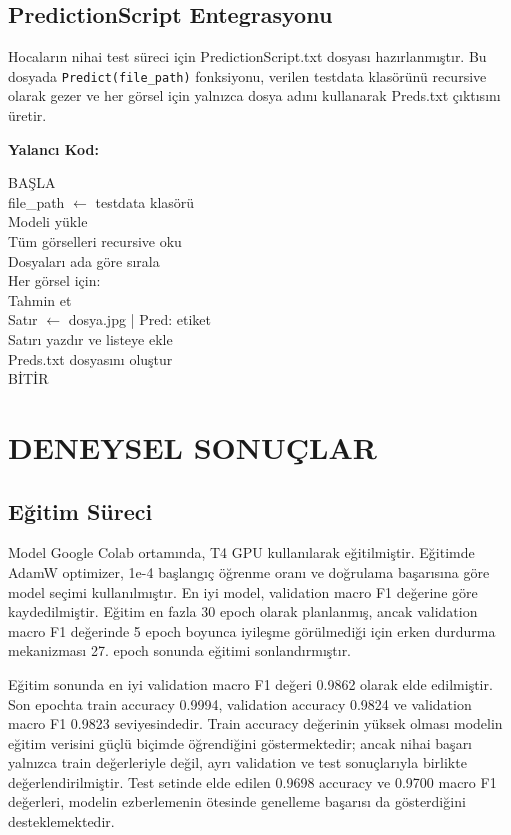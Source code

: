 \documentclass[conference]{IEEEtran}
\begin{document}
\subsection{PredictionScript Entegrasyonu}

Hocaların nihai test süreci için PredictionScript.txt dosyası
hazırlanmıştır. Bu dosyada \texttt{Predict(file\_path)} fonksiyonu, verilen
testdata klasörünü recursive olarak gezer ve her görsel için yalnızca dosya
adını kullanarak Preds.txt çıktısını üretir.

\noindent\textbf{Yalancı Kod:}
\begin{flushleft}
\ttfamily
BAŞLA \\
file\_path $\leftarrow$ testdata klasörü \\
Modeli yükle \\
Tüm görselleri recursive oku \\
Dosyaları ada göre sırala \\
Her görsel için: \\
\hspace*{1em} Tahmin et \\
\hspace*{1em} Satır $\leftarrow$ dosya.jpg | Pred: etiket \\
\hspace*{1em} Satırı yazdır ve listeye ekle \\
Preds.txt dosyasını oluştur \\
BİTİR
\end{flushleft}
\normalfont

\section{DENEYSEL SONUÇLAR}

\subsection{Eğitim Süreci}

Model Google Colab ortamında, T4 GPU kullanılarak eğitilmiştir. Eğitimde
AdamW optimizer, 1e-4 başlangıç öğrenme oranı ve doğrulama başarısına göre
model seçimi kullanılmıştır. En iyi model, validation macro F1 değerine göre
kaydedilmiştir. Eğitim en fazla 30 epoch olarak planlanmış, ancak validation
macro F1 değerinde 5 epoch boyunca iyileşme görülmediği için erken durdurma
mekanizması 27. epoch sonunda eğitimi sonlandırmıştır.
\vspace{0.4cm}

Eğitim sonunda en iyi validation macro F1 değeri 0.9862 olarak elde
edilmiştir. Son epochta train accuracy 0.9994, validation accuracy 0.9824 ve
validation macro F1 0.9823 seviyesindedir. Train accuracy değerinin yüksek
olması modelin eğitim verisini güçlü biçimde öğrendiğini göstermektedir;
ancak nihai başarı yalnızca train değerleriyle değil, ayrı validation ve
test sonuçlarıyla birlikte değerlendirilmiştir. Test setinde elde edilen
0.9698 accuracy ve 0.9700 macro F1 değerleri, modelin ezberlemenin ötesinde
genelleme başarısı da gösterdiğini desteklemektedir.
\end{document}
